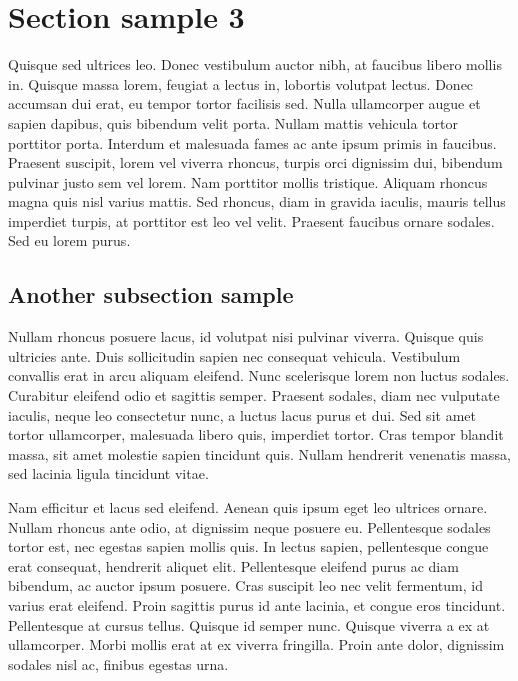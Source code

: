 \section{Section sample 3}

Quisque sed ultrices leo. Donec vestibulum auctor nibh, at faucibus libero mollis in. Quisque massa lorem, feugiat a lectus in, lobortis volutpat lectus. Donec accumsan dui erat, eu tempor tortor facilisis sed. Nulla ullamcorper augue et sapien dapibus, quis bibendum velit porta. Nullam mattis vehicula tortor porttitor porta. Interdum et malesuada fames ac ante ipsum primis in faucibus. Praesent suscipit, lorem vel viverra rhoncus, turpis orci dignissim dui, bibendum pulvinar justo sem vel lorem. Nam porttitor mollis tristique. Aliquam rhoncus magna quis nisl varius mattis. Sed rhoncus, diam in gravida iaculis, mauris tellus imperdiet turpis, at porttitor est leo vel velit. Praesent faucibus ornare sodales. Sed eu lorem purus.  

\subsection{Another subsection sample}

Nullam rhoncus posuere lacus, id volutpat nisi pulvinar viverra. Quisque quis ultricies ante. Duis sollicitudin sapien nec consequat vehicula. Vestibulum convallis erat in arcu aliquam eleifend. Nunc scelerisque lorem non luctus sodales. Curabitur eleifend odio et sagittis semper. Praesent sodales, diam nec vulputate iaculis, neque leo consectetur nunc, a luctus lacus purus et dui. Sed sit amet tortor ullamcorper, malesuada libero quis, imperdiet tortor. Cras tempor blandit massa, sit amet molestie sapien tincidunt quis. Nullam hendrerit venenatis massa, sed lacinia ligula tincidunt vitae.

Nam efficitur et lacus sed eleifend. Aenean quis ipsum eget leo ultrices ornare. Nullam rhoncus ante odio, at dignissim neque posuere eu. Pellentesque sodales tortor est, nec egestas sapien mollis quis. In lectus sapien, pellentesque congue erat consequat, hendrerit aliquet elit. Pellentesque eleifend purus ac diam bibendum, ac auctor ipsum posuere. Cras suscipit leo nec velit fermentum, id varius erat eleifend. Proin sagittis purus id ante lacinia, et congue eros tincidunt. Pellentesque at cursus tellus. Quisque id semper nunc. Quisque viverra a ex at ullamcorper. Morbi mollis erat at ex viverra fringilla. Proin ante dolor, dignissim sodales nisl ac, finibus egestas urna.

